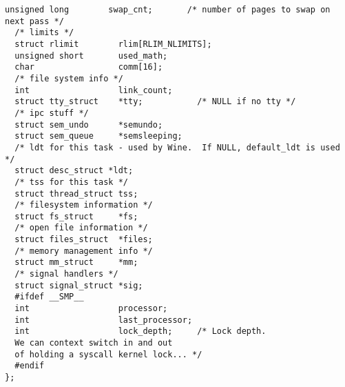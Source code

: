 \documentclass[10pt,letterpaper,onecolumn,draftclsnofoot]{IEEEtran}
\begin{document}
\begin{lstlisting}[caption=The Linux task\_struct is responsible for keeping track of the state of each process.]
  unsigned long        swap_cnt;       /* number of pages to swap on next pass */
  /* limits */
  struct rlimit        rlim[RLIM_NLIMITS];
  unsigned short       used_math;
  char                 comm[16];
  /* file system info */
  int                  link_count;
  struct tty_struct    *tty;           /* NULL if no tty */
  /* ipc stuff */
  struct sem_undo      *semundo;
  struct sem_queue     *semsleeping;
  /* ldt for this task - used by Wine.  If NULL, default_ldt is used */
  struct desc_struct *ldt;
  /* tss for this task */
  struct thread_struct tss;
  /* filesystem information */
  struct fs_struct     *fs;
  /* open file information */
  struct files_struct  *files;
  /* memory management info */
  struct mm_struct     *mm;
  /* signal handlers */
  struct signal_struct *sig;
  #ifdef __SMP__
  int                  processor;
  int                  last_processor;
  int                  lock_depth;     /* Lock depth.
  We can context switch in and out
  of holding a syscall kernel lock... */
  #endif
};
\end{lstlisting}
\end{document}

